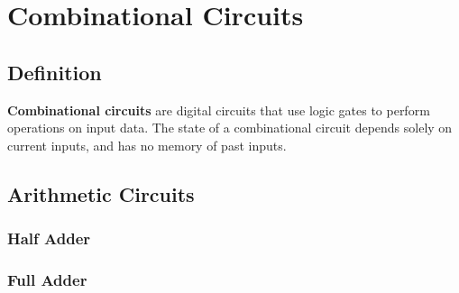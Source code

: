 \chapter{Combinational Circuits}

\section{Definition}

\textbf{Combinational circuits} are digital circuits that use logic gates to perform operations on input data. The state of a combinational circuit depends solely on current inputs, and has no memory of past inputs.

\section{Arithmetic Circuits}

\subsection{Half Adder}

\subsection{Full Adder}